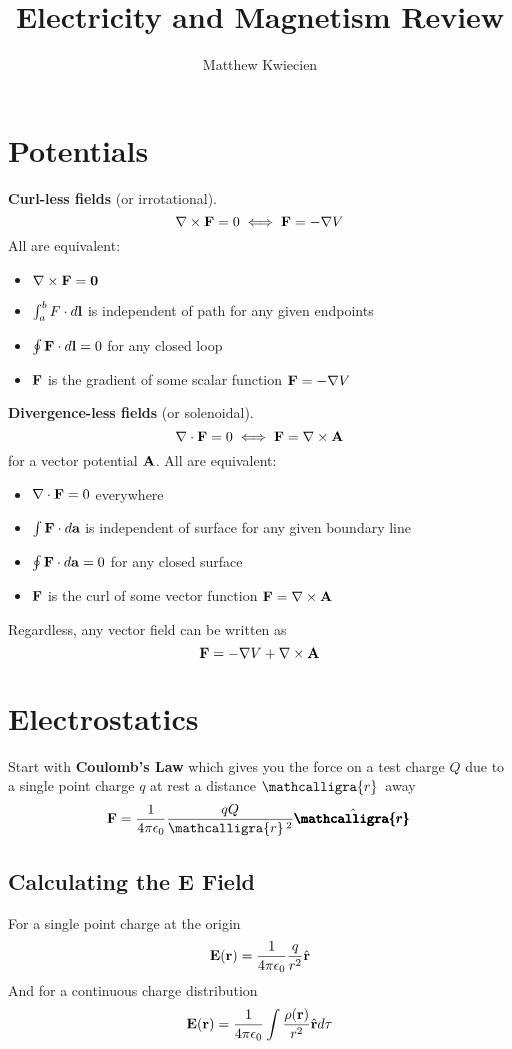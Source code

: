 \documentclass{article}
\title{Electricity and Magnetism Review}
\author{Matthew Kwiecien}
\newcommand{\scriptr}{\mathcalligra{r}\,}
\newcommand{\boldscriptr}{\pmb{\mathcalligra{r}}\,}
\newcommand{\vh}[1]{\hat{\vb{#1}}}
\newcommand{\ck}{\frac{1}{4\pi\epsilon_0}}
\begin{document}
\maketitle

\section{Potentials}

\textbf{Curl-less fields} (or irrotational). 
$$
\nabla \times \vb{F} = 0 \iff \vb{F} = -\nabla V
$$
All are equivalent:
\begin{itemize}
    \item $\nabla \times \vb{F} = \vb{0}$
    \item $\int_a^b F \cdot d\vb{l}$ is independent of path for any given endpoints
    \item $\oint \vb{F} \cdot d\vb{l} = 0$ for any closed loop
    \item $\vb{F}$ is the gradient of some scalar function $\vb{F} = -\nabla V$
\end{itemize}

\textbf{Divergence-less fields} (or solenoidal). 
$$
\nabla \cdot \vb{F} = 0 \iff \vb{F} = \nabla \times \vb{A}
$$
for a vector potential $\vb{A}$.  All are equivalent:
\begin{itemize}
    \item $\nabla \cdot \vb{F} = 0$ everywhere
    \item $\int \vb{F} \cdot d\vb{a}$ is independent of surface for any given boundary line
    \item $\oint \vb{F} \cdot d\vb{a} = 0$ for any closed surface
    \item $\vb{F} $ is the curl of some vector function $\vb{F} = \nabla \times \vb{A}$
\end{itemize}

Regardless, any vector field can be written as
$$
\vb{F} = -\nabla V + \nabla \times \vb{A}
$$

\section{Electrostatics}

Start with \textbf{Coulomb's Law} which gives you the force on a test charge $Q$ due to a single point charge $q$ at rest a distance $\scriptr$ away
$$
\vb{F} = \ck \frac{qQ}{\scriptr^2} \vh{\boldscriptr}
$$
\subsection{Calculating the E Field}
For a single point charge at the origin
$$
\vb{E}(\vb{r}) = \ck \frac{q}{r^2} \vh{r}
$$
And for a continuous charge distribution
$$
\vb{E}(\vb{r}) = \ck \int \frac{\rho(\vb{r})}{r^2} \vh{r} d\tau
$$
\end{document}
